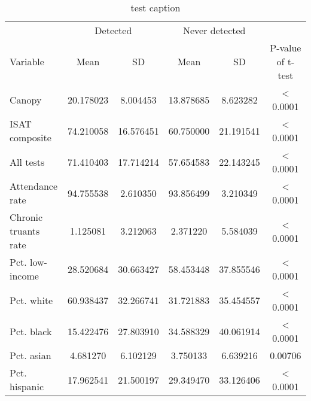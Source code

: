 \begin{table}[!h]

\caption{\label{tab:descriptive-table}test caption}
\centering
\begin{tabular}[t]{lccccc}
\toprule
\multicolumn{1}{c}{ } & \multicolumn{2}{c}{Detected} & \multicolumn{2}{c}{Never detected} & \multicolumn{1}{c}{ } \\
\cmidrule(l{3pt}r{3pt}){2-3} \cmidrule(l{3pt}r{3pt}){4-5}
Variable & Mean & SD & Mean & SD & P-value of t-test\\
\midrule
Canopy & 20.178023 & 8.004453 & 13.878685 & 8.623282 & < 0.0001\\
ISAT composite & 74.210058 & 16.576451 & 60.750000 & 21.191541 & < 0.0001\\
All tests & 71.410403 & 17.714214 & 57.654583 & 22.143245 & < 0.0001\\
Attendance rate & 94.755538 & 2.610350 & 93.856499 & 3.210349 & < 0.0001\\
Chronic truants rate & 1.125081 & 3.212063 & 2.371220 & 5.584039 & < 0.0001\\
\addlinespace
Pct. low-income & 28.520684 & 30.663427 & 58.453448 & 37.855546 & < 0.0001\\
Pct. white & 60.938437 & 32.266741 & 31.721883 & 35.454557 & < 0.0001\\
Pct. black & 15.422476 & 27.803910 & 34.588329 & 40.061914 & < 0.0001\\
Pct. asian & 4.681270 & 6.102129 & 3.750133 & 6.639216 & 0.00706\\
Pct. hispanic & 17.962541 & 21.500197 & 29.349470 & 33.126406 & < 0.0001\\
\bottomrule
\end{tabular}
\end{table}
